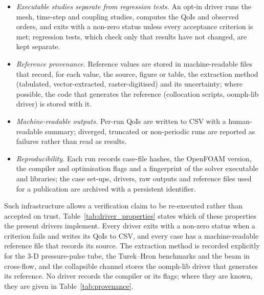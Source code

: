 \begin{itemize}
	\item \emph{Executable studies separate from regression tests.} An opt-in driver runs the mesh, time-step and coupling studies, computes the QoIs and observed orders, and exits with a non-zero status unless every acceptance criterion is met; regression tests, which check only that results have not changed, are kept separate.
	\item \emph{Reference provenance.} Reference values are stored in machine-readable files that record, for each value, the source, figure or table, the extraction method (tabulated, vector-extracted, raster-digitised) and its uncertainty; where possible, the code that generates the reference (collocation scripts, oomph-lib driver) is stored with it.
	\item \emph{Machine-readable outputs.} Per-run QoIs are written to CSV with a human-readable summary; diverged, truncated or non-periodic runs are reported as failures rather than read as results.
	\item \emph{Reproducibility.} Each run records case-file hashes, the OpenFOAM version, the compiler and optimisation flags and a fingerprint of the solver executable and libraries; the case set-ups, drivers, raw outputs and reference files used for a publication are archived with a persistent identifier.
\end{itemize}

Such infrastructure allows a verification claim to be re-executed rather than accepted on trust.
Table~\ref{tab:driver_properties} states which of these properties the present drivers implement. Every driver exits with a non-zero status when a criterion fails and writes its QoIs to CSV, and every case has a machine-readable reference file that records its source. The extraction method is recorded explicitly for the 3-D pressure-pulse tube, the Turek--Hron benchmarks and the beam in cross-flow, and the collapsible channel stores the oomph-lib driver that generates its reference. No driver records the compiler or its flags; where they are known, they are given in Table~\ref{tab:provenance}.

